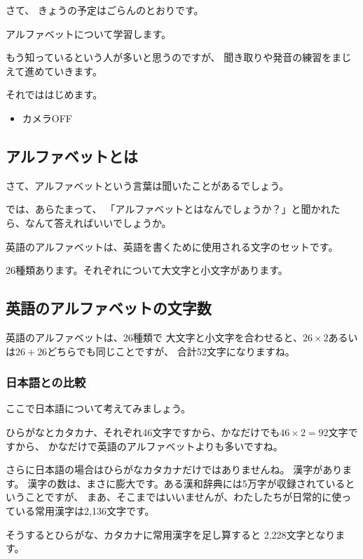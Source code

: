 \documentclass[12pt]{jlreq}
\begin{document}
さて、
きょうの予定はごらんのとおりです。

アルファベットについて学習します。

もう知っているという人が多いと思うのですが、
聞き取りや発音の練習をまじえて進めていきます。

それでははじめます。

\begin{tcolorbox}[title=zoomの管理ボタンで]
\begin{itemize}
 \item カメラOFF
\end{itemize}
\end{tcolorbox}


\subsection{アルファベットとは}

さて、アルファベットという言葉は聞いたことがあるでしょう。

では、あらたまって、
「アルファベットとはなんでしょうか？」と聞かれたら、なんて答えればいいでしょうか。

英語のアルファベットは、英語を書くために使用される文字のセットです。

26種類あります。それぞれについて大文字と小文字があります。

\subsection{英語のアルファベットの文字数}

英語のアルファベットは、26種類で
大文字と小文字を合わせると、$26\times{}2$あるいは$26+26$どちらでも同じことですが、
合計52文字になりますね。

\subsubsection{日本語との比較}

ここで日本語について考えてみましょう。

ひらがなとカタカナ、それぞれ46文字ですから、かなだけでも$46\times{}2=92\text{文字}$ですから、
かなだけで英語のアルファベットよりも多いですね。

さらに日本語の場合はひらがなカタカナだけではありませんね。
漢字があります。
漢字の数は、まさに膨大です。ある漢和辞典には5万字が収録されているということですが、
まあ、そこまではいいませんが、わたしたちが日常的に使っている常用漢字は2,136文字です。

そうするとひらがな、カタカナに常用漢字を足し算すると
2,228文字となります。
\end{document}
